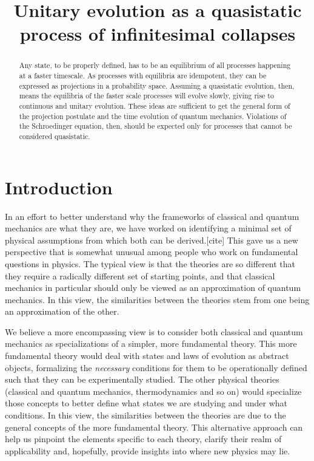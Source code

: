 \documentclass[11pt]{article}
\begin{document}
\title{Unitary evolution as a quasistatic process of infinitesimal collapses}

\maketitle

\begin{abstract}
Any state, to be properly defined, has to be an equilibrium of all processes happening at a faster timescale. As processes with equilibria are idempotent, they can be expressed as projections in a probability space. Assuming a quasistatic evolution, then, means the equilibria of the faster scale processes will evolve slowly, giving rise to continuous and unitary evolution. These ideas are sufficient to get the general form of the projection postulate and the time evolution of quantum mechanics. Violations of the Schroedinger equation, then, should be expected only for processes that cannot be considered quasistatic.
\end{abstract}


\section{Introduction}

In an effort to better understand why the frameworks of classical and quantum mechanics are what they are, we have worked on identifying a minimal set of physical assumptions from which both can be derived.[cite] This gave us a new perspective that is somewhat unusual among people who work on fundamental questions in physics. The typical view is that the theories are so different that they require a radically different set of starting points, and that classical mechanics in particular should only be viewed as an approximation of quantum mechanics. In this view, the similarities between the theories stem from one being an approximation of the other.

We believe a more encompassing view is to consider both classical and quantum mechanics as specializations of a simpler, more fundamental theory. This more fundamental theory would deal with states and laws of evolution as abstract objects, formalizing the \emph{necessary} conditions for them to be operationally defined such that they can be experimentally studied. The other physical theories (classical and quantum mechanics, thermodynamics and so on) would specialize those concepts to better define what states we are studying and under what conditions. In this view, the similarities between the theories are due to the general concepts of the more fundamental theory. This alternative approach can help us pinpoint the elements specific to each theory, clarify their realm of applicability and, hopefully, provide insights into where new physics may lie.
\end{document}
